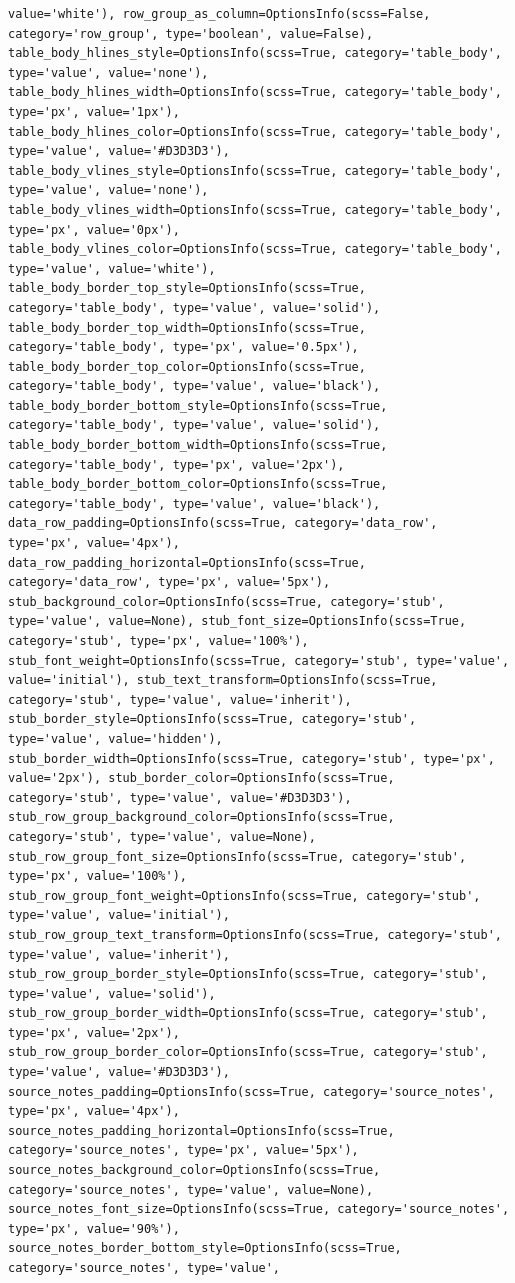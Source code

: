 \documentclass[
  letterpaper,
  DIV=11,
  numbers=noendperiod]{scrreprt}
\newcounter{none} %
\begin{document}
\begin{table}
{\begin{verbatim}
value='white'), row_group_as_column=OptionsInfo(scss=False, category='row_group', type='boolean', value=False), table_body_hlines_style=OptionsInfo(scss=True, category='table_body', type='value', value='none'), table_body_hlines_width=OptionsInfo(scss=True, category='table_body', type='px', value='1px'), table_body_hlines_color=OptionsInfo(scss=True, category='table_body', type='value', value='#D3D3D3'), table_body_vlines_style=OptionsInfo(scss=True, category='table_body', type='value', value='none'), table_body_vlines_width=OptionsInfo(scss=True, category='table_body', type='px', value='0px'), table_body_vlines_color=OptionsInfo(scss=True, category='table_body', type='value', value='white'), table_body_border_top_style=OptionsInfo(scss=True, category='table_body', type='value', value='solid'), table_body_border_top_width=OptionsInfo(scss=True, category='table_body', type='px', value='0.5px'), table_body_border_top_color=OptionsInfo(scss=True, category='table_body', type='value', value='black'), table_body_border_bottom_style=OptionsInfo(scss=True, category='table_body', type='value', value='solid'), table_body_border_bottom_width=OptionsInfo(scss=True, category='table_body', type='px', value='2px'), table_body_border_bottom_color=OptionsInfo(scss=True, category='table_body', type='value', value='black'), data_row_padding=OptionsInfo(scss=True, category='data_row', type='px', value='4px'), data_row_padding_horizontal=OptionsInfo(scss=True, category='data_row', type='px', value='5px'), stub_background_color=OptionsInfo(scss=True, category='stub', type='value', value=None), stub_font_size=OptionsInfo(scss=True, category='stub', type='px', value='100%'), stub_font_weight=OptionsInfo(scss=True, category='stub', type='value', value='initial'), stub_text_transform=OptionsInfo(scss=True, category='stub', type='value', value='inherit'), stub_border_style=OptionsInfo(scss=True, category='stub', type='value', value='hidden'), stub_border_width=OptionsInfo(scss=True, category='stub', type='px', value='2px'), stub_border_color=OptionsInfo(scss=True, category='stub', type='value', value='#D3D3D3'), stub_row_group_background_color=OptionsInfo(scss=True, category='stub', type='value', value=None), stub_row_group_font_size=OptionsInfo(scss=True, category='stub', type='px', value='100%'), stub_row_group_font_weight=OptionsInfo(scss=True, category='stub', type='value', value='initial'), stub_row_group_text_transform=OptionsInfo(scss=True, category='stub', type='value', value='inherit'), stub_row_group_border_style=OptionsInfo(scss=True, category='stub', type='value', value='solid'), stub_row_group_border_width=OptionsInfo(scss=True, category='stub', type='px', value='2px'), stub_row_group_border_color=OptionsInfo(scss=True, category='stub', type='value', value='#D3D3D3'), source_notes_padding=OptionsInfo(scss=True, category='source_notes', type='px', value='4px'), source_notes_padding_horizontal=OptionsInfo(scss=True, category='source_notes', type='px', value='5px'), source_notes_background_color=OptionsInfo(scss=True, category='source_notes', type='value', value=None), source_notes_font_size=OptionsInfo(scss=True, category='source_notes', type='px', value='90%'), source_notes_border_bottom_style=OptionsInfo(scss=True, category='source_notes', type='value', 
\end{verbatim}}
\end{table}
\end{document}
